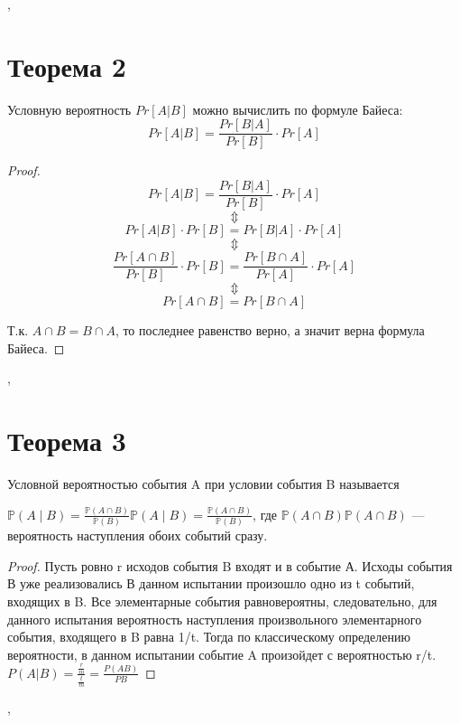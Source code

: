 \documentclass[a4paper,12pt]{article}
\begin{document}
    \sep
    \section{Теорема 2}
    \begin{theorem}
        Условную вероятность $Pr[A|B]$ можно вычислить по формуле Байеса: 
        $$ Pr[A|B] = \frac{Pr[B|A]}{Pr[B]} \cdot Pr[A]$$
    \end{theorem}
    
    \begin{proof}
        $$ Pr[A|B] = \frac{Pr[B|A]}{Pr[B]} \cdot Pr[A] $$
        $$\Updownarrow$$
        $$ Pr[A|B] \cdot Pr[B] = Pr[B|A] \cdot Pr[A] $$
        $$\Updownarrow$$
        $$ \frac{Pr[A\cap B]}{Pr[B]} \cdot Pr[B] = \frac{Pr[B\cap A]}{Pr[A]} \cdot Pr[A] $$
        $$\Updownarrow$$
        $$Pr[A\cap B] = Pr[B\cap A]$$
        
        Т.к. $A\cap B = B\cap A$, то последнее равенство верно, а значит верна формула Байеса. 
    \end{proof}
    \sep
    \section {Теорема 3}
    \begin{theorem}
   Условной вероятностью события A при условии события B называется

${\displaystyle \mathbb {P} (A\mid B)={\frac {\mathbb {P} (A\cap B)}{\mathbb {P} (B)}}} \mathbb{P}(A \mid B) = \frac{\mathbb{P}(A\cap B)}{\mathbb{P}(B)}$, где ${\displaystyle \mathbb {P} (A\cap B)} {\displaystyle \mathbb {P} (A\cap B)}$ — вероятность наступления обоих событий сразу.
    \end{theorem}
    \begin{proof}
    Пусть ровно r исходов события B входят и в событие А. Исходы события В уже реализовались
    В данном испытании произошло одно из t событий, входящих в B. Все элементарные события равновероятны, следовательно, для данного испытания вероятность наступления произвольного элементарного события, входящего в B равна 1/t. Тогда по классическому определению вероятности, в данном испытании событие A произойдет с вероятностью r/t.
    $P(A|B) = \frac{\frac{r}{m}}{\frac{t}{m}} = \frac{P(AB)}{P{B}}$

    
    \end{proof}
    \sep
\end{document}
